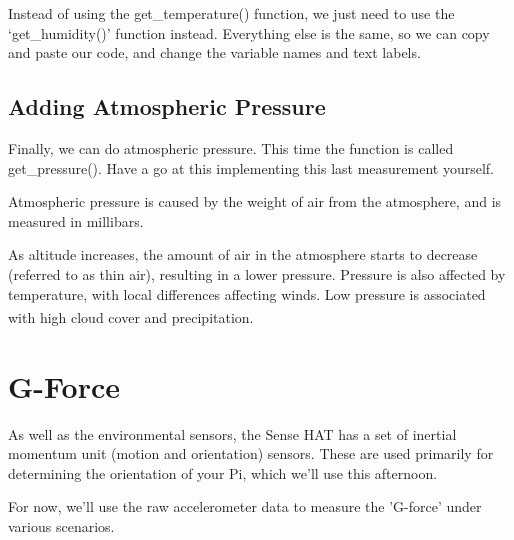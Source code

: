 	Instead of using the get\_temperature() function, we just need to use the `get\_humidity()' function instead. Everything else is the same, so we can copy and paste our code, and change the variable names and text labels.
	
	
	
	\subsection*{Adding Atmospheric Pressure}		
	Finally, we can do atmospheric pressure. This time the function is called get\_pressure(). Have a go at this implementing this last measurement yourself.
	\begin{aside}
		Atmospheric pressure is caused by the weight of air from the atmosphere, and is measured in millibars.
		
		As altitude increases, the amount of air in the atmosphere starts to decrease (referred to as thin air), resulting in a lower pressure. Pressure is also affected by temperature, with local differences affecting winds. Low pressure is associated with high cloud cover and precipitation.
		\textsuperscript{\cite{pressure}}
	\end{aside}
	
	\webclearpage
	\section{G-Force}
	
	As well as the environmental sensors, the Sense HAT has a set of inertial momentum unit (motion and orientation) sensors. These are used primarily for determining the orientation of your Pi, which we'll use this afternoon.
	
	For now, we'll use the raw accelerometer data to measure the 'G-force' under various scenarios.
	
